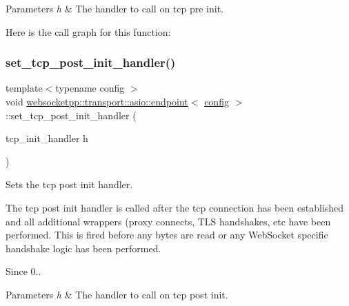 \begin{DoxyParams}{Parameters}
{\em h} & The handler to call on tcp pre init. \\
\hline
\end{DoxyParams}
Here is the call graph for this function\+:
\mbox{\label{classwebsocketpp_1_1transport_1_1asio_1_1endpoint_a605c9f8c671d783739c1e98c6c7fda9d}} 
\subsubsection{\texorpdfstring{set\+\_\+tcp\+\_\+post\+\_\+init\+\_\+handler()}{set\_tcp\_post\_init\_handler()}}
{\footnotesize\ttfamily template$<$typename config $>$ \\
void \mbox{\hyperlink{classwebsocketpp_1_1transport_1_1asio_1_1endpoint}{websocketpp\+::transport\+::asio\+::endpoint}}$<$ \mbox{\hyperlink{classconfig}{config}} $>$\+::set\+\_\+tcp\+\_\+post\+\_\+init\+\_\+handler (\begin{DoxyParamCaption}\item[{tcp\+\_\+init\+\_\+handler}]{h }\end{DoxyParamCaption})\hspace{0.3cm}{\ttfamily [inline]}}



Sets the tcp post init handler. 

The tcp post init handler is called after the tcp connection has been established and all additional wrappers (proxy connects, T\+LS handshakes, etc have been performed. This is fired before any bytes are read or any Web\+Socket specific handshake logic has been performed.

\begin{DoxySince}{Since}
0..
\end{DoxySince}

\begin{DoxyParams}{Parameters}
{\em h} & The handler to call on tcp post init. \\
\hline
\end{DoxyParams}
\mbox{\label{classwebsocketpp_1_1transport_1_1asio_1_1endpoint_ad334b214cf4800bb34aa09d7055e6464}} 
